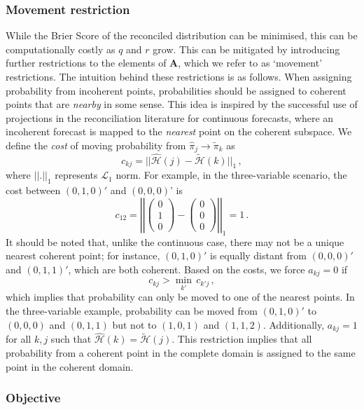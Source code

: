 \documentclass[a4paper,review,12pt,authoryear]{elsarticle}
\theoremstyle{definition}
\begin{document}
    \subsubsection*{\textbf{Movement restriction}}
    While the Brier Score of the reconciled distribution can be minimised, this can be computationally costly as $q$ and $r$ grow. This can be mitigated by introducing further restrictions to the elements of $\mathbf{A}$, which we refer to as `movement' restrictions.  The intuition behind these restrictions is as follows. When assigning probability from incoherent points, probabilities should be assigned to coherent points that are \emph{nearby} in some sense. This idea is inspired by the successful use of projections in the reconciliation literature for continuous forecasts, where an incoherent forecast is mapped to the \emph{nearest} point on the coherent subspace. We define the \emph{cost} of moving probability from $\hat{\pi}_j\rightarrow\tilde{\pi}_k$ as
    \[
    c_{kj}=||\hat{\mathcal{H}}(j)-\tilde{\mathcal{H}}(k)||_1\,,
    \]
    where $||.||_1$ represents $\mathcal{L}_1$ norm. For example, in the three-variable scenario, the cost between $(0, 1, 0)'$ and $(0, 0, 0)$' is
    \[
    c_{12}=\left|\left|\begin{pmatrix}0\\1\\0\end{pmatrix}-\begin{pmatrix}0\\0\\0\end{pmatrix}\right|\right|_1=1\,.
    \]
    It should be noted that, unlike the continuous case, there may not be a unique nearest coherent point; for instance, $(0,1,0)'$ is equally distant from $(0,0,0)'$ and $(0,1,1)'$, which are both coherent.
    Based on the costs, we force $a_{kj}=0$ if
    \[
      c_{kj}>\underset{k'}{\min}\,c_{k'j}\,,
    \]
    which implies that probability can only be moved to one of the nearest points. In the three-variable example, probability can be moved from $(0,1,0)'$ to $(0,0,0)$ and $(0,1,1)$ but not to $(1,0,1)$ and $(1,1,2)$.
    Additionally, $a_{kj}=1$ for all $k,j$ such that $\hat{\mathcal{H}}(k)=\tilde{\mathcal{H}}(j)$.
    This restriction implies that all probability from a coherent point in the complete domain is assigned to the same point in the coherent domain.



    \subsubsection*{\textbf{Objective}}
\end{document}

